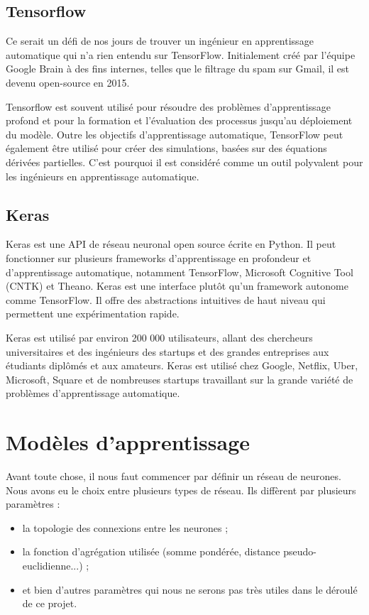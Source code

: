 \documentclass[oneside,13pt,a4paper]{report}
\begin{document}
\subsection{Tensorflow}

Ce serait un défi de nos jours de trouver un ingénieur en apprentissage automatique qui n'a rien entendu sur TensorFlow. Initialement créé par l'équipe Google Brain à des fins internes, telles que le filtrage du spam sur Gmail, il est devenu open-source en 2015.

Tensorflow est souvent utilisé pour résoudre des problèmes d'apprentissage profond et pour la formation et l'évaluation des processus jusqu'au déploiement du modèle. Outre les objectifs d'apprentissage automatique, TensorFlow peut également être utilisé pour créer des simulations, basées sur des équations dérivées partielles. C'est pourquoi il est considéré comme un outil polyvalent pour les ingénieurs en apprentissage automatique.

\subsection{Keras}

Keras est une API de réseau neuronal open source écrite en Python. Il peut fonctionner sur plusieurs frameworks d'apprentissage en profondeur et d'apprentissage automatique, notamment TensorFlow, Microsoft Cognitive Tool (CNTK) et Theano.
Keras est une interface plutôt qu'un framework autonome comme TensorFlow. Il offre des abstractions intuitives de haut niveau qui permettent une expérimentation rapide.

Keras est utilisé par environ 200 000 utilisateurs, allant des chercheurs universitaires et des ingénieurs des startups et des grandes entreprises aux étudiants diplômés et aux amateurs. Keras est utilisé chez Google, Netflix, Uber, Microsoft, Square et de nombreuses startups travaillant sur la grande variété de problèmes d'apprentissage automatique.

\section{Modèles d'apprentissage}

Avant toute chose, il nous faut commencer par définir un réseau de neurones. Nous avons eu le choix entre plusieurs types de réseau. Ils diffèrent par plusieurs paramètres :

\begin{itemize}
\item la topologie des connexions entre les neurones ;
\item la fonction d’agrégation utilisée (somme pondérée, distance pseudo-euclidienne...) ;
\item et bien d'autres paramètres qui nous ne serons pas très utiles dans le déroulé de ce projet.
\end{itemize}
\end{document}

